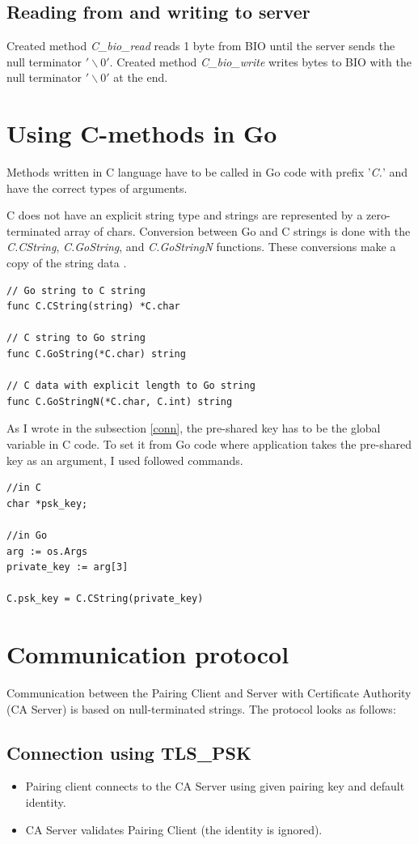 \documentclass[
  digital, %
  notable,   %
  lof,     %
  lot,     %
]{fithesis3}
\begin{document}
\subsection{Reading from and writing to server}
Created method \textit{C\_bio\_read} reads 1 byte from BIO until the server sends the null 
terminator $'\backslash0'$. Created method \textit{C\_bio\_write} writes bytes to BIO with the 
null terminator $'\backslash0'$ at the end.

\section{Using C-methods in Go}\label{c-method}
Methods written in C language have to be called in Go code with prefix '\textit{C.}' and have the 
correct types of arguments. 

C does not have an explicit string type and strings are represented by 
a zero-terminated array of chars. Conversion between Go and C strings is done with the 
\textit{C.CString}, \textit{C.GoString}, and \textit{C.GoStringN} functions. These conversions 
make a copy of the string data \cite{bloggolangorg}. 

\begin{lstlisting}
// Go string to C string
func C.CString(string) *C.char

// C string to Go string
func C.GoString(*C.char) string

// C data with explicit length to Go string
func C.GoStringN(*C.char, C.int) string
\end{lstlisting}

As I wrote in the subsection \ref{conn}, the pre-shared key has to be the global variable in C 
code. To set it from Go code where application takes the pre-shared key as an argument, I used 
followed commands.
\begin{lstlisting}
//in C
char *psk_key;

//in Go
arg := os.Args
private_key := arg[3]

C.psk_key = C.CString(private_key)
\end{lstlisting}

\section{Communication protocol}
Communication between the Pairing Client and Server with Certificate Authority (CA Server) is based on null-terminated strings. The protocol looks as follows:

\subsection{Connection using TLS\_PSK}
\begin{itemize}[leftmargin=2em,rightmargin=1em,itemsep=0.75\parskip,parsep=0em,topsep=0em,partopsep=0em]
\item Pairing client connects to the CA Server using given pairing key and default identity.
\item CA Server validates Pairing Client (the identity is ignored).
\end{itemize}
\end{document}

